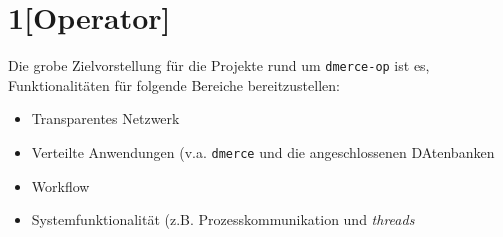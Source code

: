 \chapter{1{[}Operator{]}}

\newpage

Die grobe Zielvorstellung f\"ur die Projekte rund um
\texttt{dmerce-op} ist es, Funktionalit\"aten f\"ur folgende Bereiche
bereitzustellen:

\begin{itemize}
\item Transparentes Netzwerk
\item Verteilte Anwendungen (v.a. \texttt{dmerce} und die
  angeschlossenen DAtenbanken
\item Workflow
\item Systemfunktionalit\"at (z.B.  Prozesskommunikation und
  \textit{threads}
\end{itemize}

